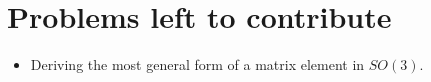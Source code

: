 \section{Problems left to contribute}
\begin{itemize}
	\item Deriving the most general form of a matrix element in $SO(3)$. 
\end{itemize}



